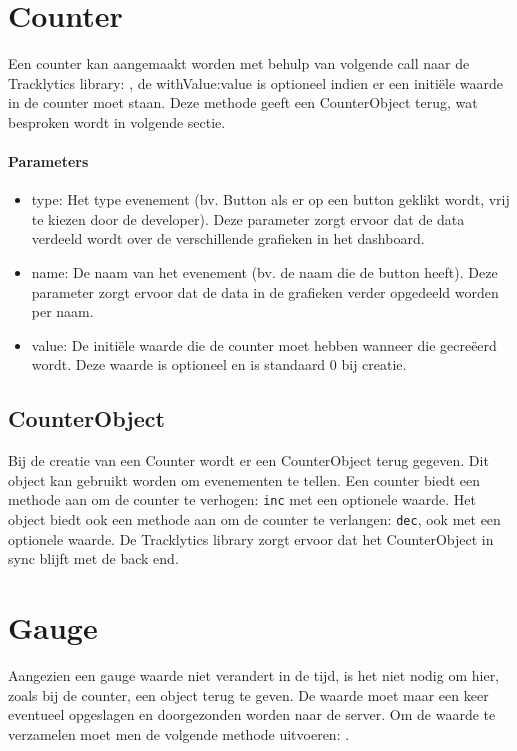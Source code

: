 \section{Counter}
Een counter kan aangemaakt worden met behulp van volgende call naar de Tracklytics library: \texttt{}, de withValue:value is optioneel indien er een initi\"ele waarde in de counter moet staan. Deze methode geeft een CounterObject terug, wat besproken wordt in volgende sectie. \\

\paragraph{Parameters}
\begin{itemize}
\item type: Het type evenement (bv. Button als er op een button geklikt wordt, vrij te kiezen door de developer). Deze parameter zorgt ervoor dat de data verdeeld wordt over de verschillende grafieken in het dashboard.
\item name: De naam van het evenement (bv. de naam die de button heeft). Deze parameter zorgt ervoor dat de data in de grafieken verder opgedeeld worden per naam.
\item value: De initi\"ele waarde die de counter moet hebben wanneer die gecre\"eerd wordt. Deze waarde is optioneel en is standaard 0 bij creatie.
\end{itemize}

\subsection{CounterObject}
Bij de creatie van een Counter wordt er een CounterObject terug gegeven. Dit object kan gebruikt worden om evenementen te tellen. Een counter biedt een methode aan om de counter te verhogen: \texttt{inc} met een optionele waarde. Het object biedt ook een methode aan om de counter te verlangen: \texttt{dec}, ook met een optionele waarde. De Tracklytics library zorgt ervoor dat het CounterObject in sync blijft met de back end. 


\section{Gauge}
Aangezien een gauge waarde niet verandert in de tijd, is het niet nodig om hier, zoals bij de counter, een object terug te geven. De waarde moet maar een keer eventueel opgeslagen en doorgezonden worden naar de server. Om de waarde te verzamelen moet men de volgende methode uitvoeren: \texttt{}. 


